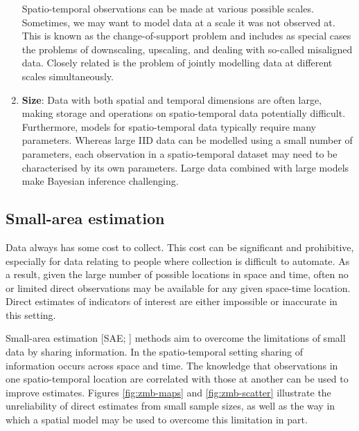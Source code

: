 \documentclass[a4paper, nobind]{templates/ociamthesis}
\begin{document}
\begin{enumerate}
  Spatio-temporal observations can be made at various possible scales.
  Sometimes, we may want to model data at a scale it was not observed at.
  This is known as the change-of-support problem \autocite{gelfand2001change} and includes as special cases the problems of downscaling, upscaling, and dealing with so-called misaligned data.
  Closely related is the problem of jointly modelling data at different scales simultaneously.
\item
  \textbf{Size}:
  Data with both spatial and temporal dimensions are often large, making storage and operations on spatio-temporal data potentially difficult.
  Furthermore, models for spatio-temporal data typically require many parameters.
  Whereas large IID data can be modelled using a small number of parameters, each observation in a spatio-temporal dataset may need to be characterised by its own parameters.
  Large data combined with large models make Bayesian inference challenging.
\end{enumerate}

\hypertarget{small-area-estimation}{%
\subsection{Small-area estimation}\label{small-area-estimation}}

Data always has some cost to collect.
This cost can be significant and prohibitive, especially for data relating to people where collection is difficult to automate.
As a result, given the large number of possible locations in space and time, often no or limited direct observations may be available for any given space-time location.
Direct estimates of indicators of interest are either impossible or inaccurate in this setting.

Small-area estimation {[}SAE; \textcite{pfeffermann2013new}{]} methods aim to overcome the limitations of small data by sharing information.
In the spatio-temporal setting sharing of information occurs across space and time.
The knowledge that observations in one spatio-temporal location are correlated with those at another can be used to improve estimates.
Figures \ref{fig:zmb-maps} and \ref{fig:zmb-scatter} illustrate the unreliability of direct estimates from small sample sizes, as well as the way in which a spatial model may be used to overcome this limitation in part.
\end{document}
